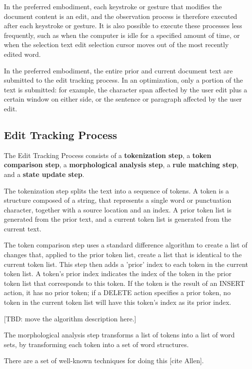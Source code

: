 \documentclass{article}
\newcommand{\dfn}[1]{\textbf{#1}}
\begin{document}
In the preferred embodiment, each keystroke or gesture that modifies the document content is an edit, and the observation process is therefore executed after each keystroke or gesture.  It is also possible to execute these processes less frequently, such as when the computer is idle for a specified amount of time, or when the selection text edit selection cursor moves out of the most recently edited word.

In the preferred embodiment, the entire prior and current document text are submitted to the edit tracking process.  In an optimization, only a portion of the text is submitted: for example, the character span affected by the user edit plus a certain window on either side, or the sentence or paragraph affected by the user edit.

\subsection{Edit Tracking Process}

The Edit Tracking Process consists of a \dfn{tokenization step}, a \dfn{token comparison step}, a \dfn{morphological analysis step}, a \dfn{rule matching step}, and a \dfn{state update step}.

The tokenization step splits the text into a sequence of tokens.  A token is a structure composed of a string, that represents a single word or punctuation character, together with a source location and an index.  A prior token list is generated from the prior text, and a current token list is generated from the current text.

The token comparison step uses a standard difference algorithm to create a list of changes that, applied to the prior token list, create a list that is identical to the current token list.  This step then adds a 'prior' index to each token in the current token list.  A token's prior index indicates the index of the token in the prior token list that corresponds to this token.  If the token is the result of an INSERT action, it has no prior token; if a DELETE action specifies a prior token, no token in the current token list will have this token's index as its prior index.

[TBD: move the algorithm description here.]

The morphological analysis step transforms a list of tokens into a list of word sets, by transforming each token into a set of word structures.

There are a set of well-known techniques for doing this [cite Allen].
\end{document}
